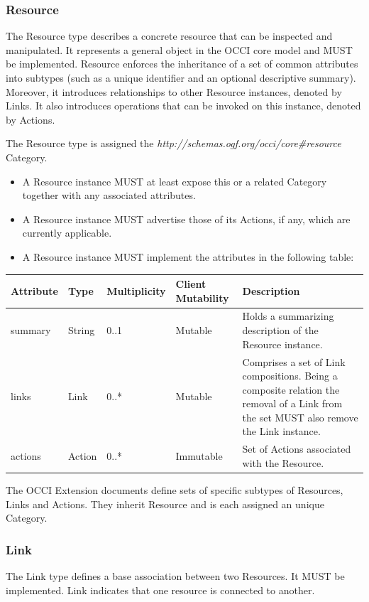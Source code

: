 \documentclass[10pt,a4paper,british]{article}
\begin{document}
\subsubsection{Resource}
The Resource type describes a concrete resource that can be inspected
and manipulated. It represents a general object in the OCCI core model
and MUST be implemented. Resource enforces the inheritance of a set of
common attributes into subtypes (such as a unique identifier and an
optional descriptive summary). Moreover, it introduces relationships
to other Resource instances, denoted by Links. It also introduces
operations that can be invoked on this instance, denoted by Actions.

The Resource type is assigned the
\textit{http://schemas.ogf.org/occi/core\#resource} Category.

\begin{itemize}
  \item A Resource instance MUST at least expose this or a related
    Category together with any associated attributes.
  \item A Resource instance MUST advertise those of its Actions, if
    any, which are currently applicable.
  \item A Resource instance MUST implement the attributes in the
    following table:
\end{itemize}

\begin{tabular}{l|l|l|l|p{2.7in}}
Attribute & Type & Multiplicity & Client Mutability & Description \\
\hline
summary & String & 0..1 & Mutable & Holds a summarizing description of the Resource instance.\\
links & Link & 0..* & Mutable & Comprises a set of Link compositions. Being a composite relation the removal of a Link from the set MUST also remove the Link instance.\\
actions & Action & 0..* & Immutable & Set of Actions associated with the Resource.\\
\end{tabular}

The OCCI Extension documents define sets of specific subtypes of
Resources, Links and Actions. They inherit Resource and is each
assigned an unique Category.

\subsubsection{Link}
The Link type defines a base association between two Resources. It
MUST be implemented. Link indicates that one resource is connected to
another.
\end{document}
